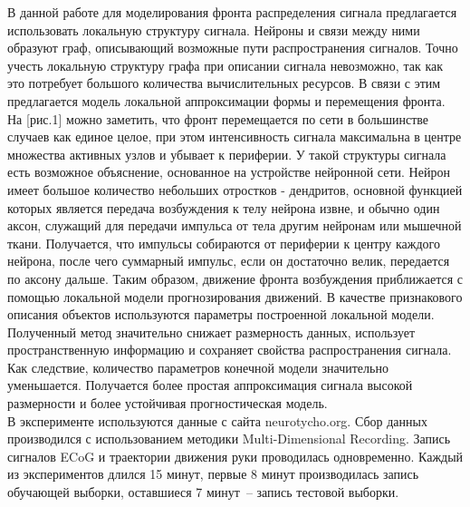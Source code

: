 \documentclass[12pt,twoside]{article}
\begin{document}
В данной работе для моделирования фронта распределения сигнала предлагается использовать локальную структуру сигнала. Нейроны и связи между ними образуют граф, описывающий возможные пути распространения сигналов. Точно учесть локальную структуру графа при описании сигнала невозможно, так как это потребует большого количества вычислительных ресурсов. В связи с этим предлагается модель локальной аппроксимации формы и перемещения фронта. На [рис.1] можно заметить, что фронт перемещается по сети в большинстве случаев как единое целое, при этом интенсивность сигнала максимальна в центре множества активных узлов и убывает к периферии. У такой структуры сигнала есть возможное объяснение, основанное на устройстве нейронной сети. Нейрон имеет большое количество небольших отростков - дендритов, основной функцией которых является передача возбуждения к телу нейрона извне, и обычно один аксон, служащий для передачи импульса от тела другим нейронам или мышечной ткани. Получается, что импульсы собираются от периферии к центру каждого нейрона, после чего суммарный импульс, если он достаточно велик, передается по аксону дальше. Таким образом, движение фронта возбуждения приближается с помощью локальной модели прогнозирования движений. В качестве признакового описания объектов используются параметры построенной локальной модели. Полученный  метод значительно снижает размерность данных, использует пространственную информацию и сохраняет свойства распространения сигнала.
Как следствие, количество параметров конечной модели значительно уменьшается. Получается более простая аппроксимация сигнала высокой размерности и более устойчивая прогностическая модель.\\
В эксперименте используются данные с сайта neurotycho.org. Сбор данных производился с использованием методики Multi-Dimensional Recording. Запись сигналов ECoG и траектории движения руки проводилась одновременно. Каждый из экспериментов длился 15 минут, первые 8 минут производилась запись обучающей выборки, оставшиеся 7 минут~– запись тестовой выборки.
\end{document}
